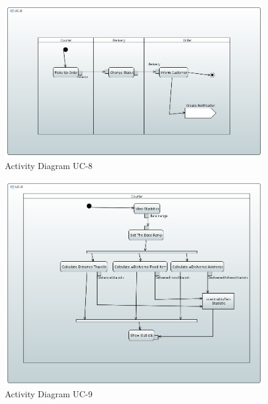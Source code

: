 \begin{figure}[h!]
\begin{center}
\includegraphics[scale=0.4]{FIGS/UC-8.PNG}
    \caption{Activity Diagram UC-8}
    \label{fig:act_diag8}
\end{center}
\end{figure}

\begin{figure}[h!]
\begin{center}
\includegraphics[scale=0.4]{FIGS/UC-9.PNG}
    \caption{Activity Diagram UC-9}
    \label{fig:act_diag9}
\end{center}
\end{figure}

